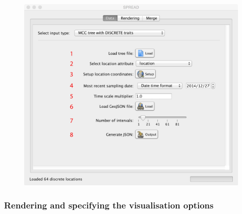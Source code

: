 \documentclass[english]{paper}
\begin{document}
\begin{figure}[!H]
\centering
\includegraphics[width=1\textwidth]{./figures/Fig1_parsing_discrete.pdf} %
\label{fig:parseDiscrete}
\end{figure}

\subsubsection{Rendering and specifying the visualisation options}
\end{document}
